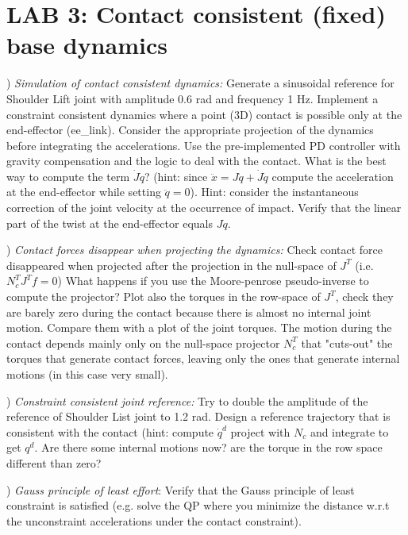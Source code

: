 \documentclass{report}
\begin{document}
\section*{LAB 3: Contact consistent (fixed) base dynamics}


\quad

) \textit{Simulation of contact consistent dynamics:}
Generate a sinusoidal reference for Shoulder Lift joint with amplitude 0.6 rad and frequency 1 Hz.
Implement a constraint consistent dynamics where a point (3D) contact is possible only at the end-effector (ee\_link). 
Consider the appropriate projection of the dynamics before integrating the accelerations. 
Use the pre-implemented PD controller with gravity compensation and the logic 
to deal with the contact. What is the best way to compute the term $\dot{J}\dot{q}$? (hint: since $\ddot{x} = J\ddot{q} + \dot{J}\dot{q}$ compute the acceleration at the end-effector while setting $\ddot{q}= 0$).
Hint: consider the instantaneous correction of the joint velocity at the occurrence of impact.
Verify that the linear part of the twist at the end-effector equals $J\dot{q}$.

\quad

) \textit{Contact forces disappear when projecting the dynamics:}
Check contact force disappeared when projected after the projection in the null-space of $J^T$  (i.e. $ N_c^TJ^Tf = 0$) 
What happens if you use the Moore-penrose pseudo-inverse to compute the projector?
Plot also the torques in the row-space of $J^T$, check they are barely zero 
during the contact because there is almost no internal joint motion. 
Compare them with a plot of the joint torques.
The motion during the contact depends mainly only on the null-space projector $N_c^T$
that "cuts-out" the torques that generate contact forces, leaving only the ones that generate internal motions (in this case very small).

\quad

) \textit{Constraint consistent joint reference:}
Try to double the amplitude of the reference of Shoulder List joint to 1.2 rad.
Design a reference trajectory that is consistent with the contact (hint: compute $\dot{q}^{d}$ project with $N_c$ and integrate to get $q^d$.
Are there some internal motions now? are the torque in the row space different than zero?  

\quad

) \textit{Gauss principle of least effort}:
Verify that the Gauss principle of least constraint is satisfied (e.g. solve the QP where you minimize the distance w.r.t the unconstraint accelerations under the contact constraint).
\end{document}
